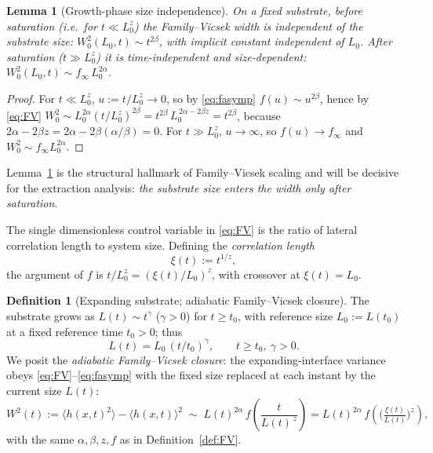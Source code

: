 \documentclass{amsart}
\newtheorem{lemma}{Lemma}
\theoremstyle{definition}
\newtheorem{definition}{Definition}
\newcommand{\asymp}{\sim}
\begin{document}
\begin{lemma}[Growth-phase size independence]\label{lem:sizeindep}
On a fixed substrate, before saturation (i.e.\ for $t\ll L_0^{z}$) the
Family--Vicsek width is independent of the substrate size:
$W_0^2(L_0,t)\asymp t^{2\beta}$, with implicit constant independent of $L_0$.
After saturation ($t\gg L_0^{z}$) it is time-independent and size-dependent:
$W_0^2(L_0,t)\asymp f_\infty\,L_0^{2\alpha}$.
\end{lemma}
\begin{proof}
For $t\ll L_0^{z}$, $u:=t/L_0^{z}\to0$, so by \eqref{eq:fasymp}
$f(u)\asymp u^{2\beta}$, hence by \eqref{eq:FV}
$W_0^2\asymp L_0^{2\alpha}(t/L_0^{z})^{2\beta}=t^{2\beta}\,L_0^{\,2\alpha-2\beta z}
=t^{2\beta}$, because $2\alpha-2\beta z=2\alpha-2\beta(\alpha/\beta)=0$. For
$t\gg L_0^{z}$, $u\to\infty$, so $f(u)\to f_\infty$ and
$W_0^2\asymp f_\infty L_0^{2\alpha}$.
\end{proof}

Lemma~\ref{lem:sizeindep} is the structural hallmark of Family--Vicsek scaling and
will be decisive for the extraction analysis: \emph{the substrate size enters the
width only after saturation}.

The single dimensionless control variable in \eqref{eq:FV} is the ratio of lateral
correlation length to system size. Defining the \emph{correlation length}
\begin{equation}\label{eq:xi}
  \xi(t):=t^{1/z},
\end{equation}
the argument of $f$ is $t/L_0^{z}=(\xi(t)/L_0)^{z}$, with crossover at
$\xi(t)=L_0$.

\begin{definition}[Expanding substrate; adiabatic Family--Vicsek closure]\label{def:expand}
The substrate grows as $L(t)\asymp t^{\gamma}$ ($\gamma>0$) for $t\ge t_0$, with
reference size $L_0:=L(t_0)$ at a fixed reference time $t_0>0$; thus
\begin{equation}\label{eq:Lt}
  L(t)=L_0\,(t/t_0)^{\gamma},\qquad t\ge t_0,\ \gamma>0.
\end{equation}
We posit the \emph{adiabatic Family--Vicsek closure}: the expanding-interface
variance obeys \eqref{eq:FV}--\eqref{eq:fasymp} with the fixed size replaced at
each instant by the current size $L(t)$:
\begin{equation}\label{eq:adiabatic}
  W^2(t):=\langle h(x,t)^2\rangle-\langle h(x,t)\rangle^2
  \;\asymp\; L(t)^{2\alpha}\, f\!\left(\frac{t}{L(t)^{\,z}}\right)
  = L(t)^{2\alpha}\, f\!\left(\Big(\tfrac{\xi(t)}{L(t)}\Big)^{z}\right),
\end{equation}
with the same $\alpha,\beta,z,f$ as in Definition~\ref{def:FV}.
\end{definition}
\end{document}
